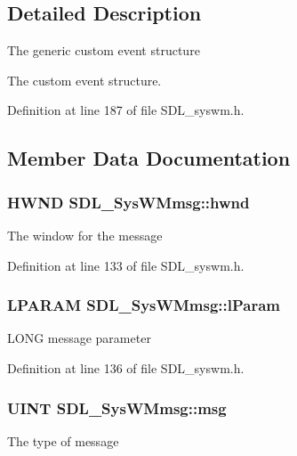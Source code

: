 \subsection{Detailed Description}
The generic custom event structure

The custom event structure. 

Definition at line 187 of file S\+D\+L\+\_\+syswm.\+h.



\subsection{Member Data Documentation}
\hypertarget{structSDL__SysWMmsg_a55cf9583b5eddfe60a5c9851f9cce457}{
\subsubsection[{hwnd}]{\setlength{\rightskip}{0pt plus 5cm}H\+W\+N\+D S\+D\+L\+\_\+\+Sys\+W\+Mmsg\+::hwnd}}\label{structSDL__SysWMmsg_a55cf9583b5eddfe60a5c9851f9cce457}
The window for the message 

Definition at line 133 of file S\+D\+L\+\_\+syswm.\+h.

\hypertarget{structSDL__SysWMmsg_a24c1e4c3cb8d9781d34e5d99df66ac36}{
\subsubsection[{l\+Param}]{\setlength{\rightskip}{0pt plus 5cm}L\+P\+A\+R\+A\+M S\+D\+L\+\_\+\+Sys\+W\+Mmsg\+::l\+Param}}\label{structSDL__SysWMmsg_a24c1e4c3cb8d9781d34e5d99df66ac36}
L\+O\+N\+G message parameter 

Definition at line 136 of file S\+D\+L\+\_\+syswm.\+h.

\hypertarget{structSDL__SysWMmsg_a74894ed060d5508ab06aac584154d61e}{
\subsubsection[{msg}]{\setlength{\rightskip}{0pt plus 5cm}U\+I\+N\+T S\+D\+L\+\_\+\+Sys\+W\+Mmsg\+::msg}}\label{structSDL__SysWMmsg_a74894ed060d5508ab06aac584154d61e}
The type of message 

